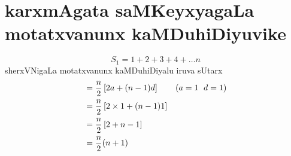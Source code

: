 \chapter{karxmAgata saMKeyxyagaLa motatxvanunx kaMDuhiDiyuvike}


$$
S_{1} = 1+2+3+4+\ldots n 
$$
sherxVNigaLa motatxvanunx kaMDuhiDiyalu iruva sUtarx
\begin{align*}
&=\frac{n}{2}\left[2a+(n-1)d\right] \qquad \text{($a = 1$\; $d=1$)}\\
&=\frac{n}{2}\left[2\times 1 +(n-1)1\right]\\
&=\frac{n}{2}\left[2+n-1\right]\\
&=\frac{n}{2}(n+1)
\end{align*}

